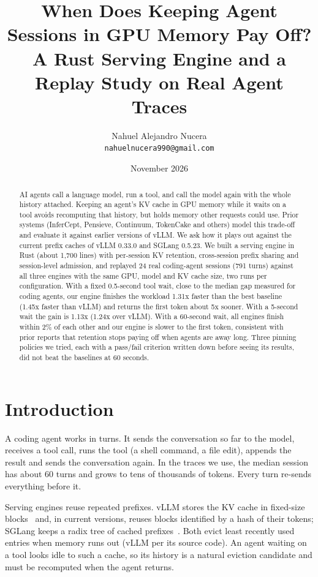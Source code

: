 \documentclass[11pt]{article}
\title{When Does Keeping Agent Sessions in GPU Memory Pay Off?\\
\large A Rust Serving Engine and a Replay Study on Real Agent Traces}
\author{Nahuel Alejandro Nucera\\\texttt{nahuelnucera990@gmail.com}}
\date{November 2026}
\begin{document}
\maketitle

\begin{abstract}
AI agents call a language model, run a tool, and call the model again with the whole history attached. Keeping an agent's KV cache in GPU memory while it waits on a tool avoids recomputing that history, but holds memory other requests could use. Prior systems (InferCept, Pensieve, Continuum, TokenCake and others) model this trade-off and evaluate it against earlier versions of vLLM. We ask how it plays out against the current prefix caches of vLLM 0.33.0 and SGLang 0.5.23. We built a serving engine in Rust (about 1,700 lines) with per-session KV retention, cross-session prefix sharing and session-level admission, and replayed 24 real coding-agent sessions (791 turns) against all three engines with the same GPU, model and KV cache size, two runs per configuration. With a fixed 0.5-second tool wait, close to the median gap measured for coding agents, our engine finishes the workload 1.31x faster than the best baseline (1.45x faster than vLLM) and returns the first token about 5x sooner. With a 5-second wait the gain is 1.13x (1.24x over vLLM). With a 60-second wait, all engines finish within 2\% of each other and our engine is slower to the first token, consistent with prior reports that retention stops paying off when agents are away long. Three pinning policies we tried, each with a pass/fail criterion written down before seeing its results, did not beat the baselines at 60 seconds.
\end{abstract}

\section{Introduction}

A coding agent works in turns. It sends the conversation so far to the model, receives a tool call, runs the tool (a shell command, a file edit), appends the result and sends the conversation again. In the traces we use, the median session has about 60 turns and grows to tens of thousands of tokens. Every turn re-sends everything before it.

Serving engines reuse repeated prefixes. vLLM stores the KV cache in fixed-size blocks~\cite{vllm} and, in current versions, reuses blocks identified by a hash of their tokens; SGLang keeps a radix tree of cached prefixes~\cite{sglang}. Both evict least recently used entries when memory runs out (vLLM per its source code). An agent waiting on a tool looks idle to such a cache, so its history is a natural eviction candidate and must be recomputed when the agent returns.
\end{document}
